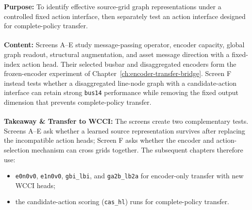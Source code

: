\begin{tcolorbox}[  
  colframe=red!75!black,
  colback=red!5!white,
  coltext=red,
  title=Chapter 6 Summary: Two Design Branches]
\textbf{Purpose:} To identify effective source-grid graph
representations under a controlled fixed action interface, then separately
test an action interface designed for complete-policy transfer.
\\
\\
\textbf{Content:} Screens A--E study message-passing operator,
encoder capacity, global graph readout, structural augmentation, and asset
message direction with a fixed-index action head. Their selected busbar and
disaggregated encoders form the frozen-encoder experiment of
Chapter~\ref{ch:encoder-transfer-bridge}. Screen F instead tests whether a
disaggregated line-node graph with a candidate-action interface can retain
strong \texttt{bus14} performance while removing the fixed output dimension
that prevents complete-policy transfer.
\\
\\
\textbf{Takeaway \& Transfer to WCCI:} The screens create two
complementary tests. Screens A--E ask whether a learned source representation
survives after replacing the incompatible action heads; Screen F asks whether
the encoder and action-selection mechanism can cross grids together. The
subsequent chapters therefore use:
\begin{itemize}
    \item \texttt{e0n0v0}, \texttt{e1n0v0}, \texttt{gbi\_lbi}, and \texttt{ga2b\_lb2a} for encoder-only transfer with new WCCI heads;
    \item the candidate-action scoring (\texttt{cas\_hl}) runs for complete-policy transfer.
\end{itemize}
\end{tcolorbox}
\endgroup
